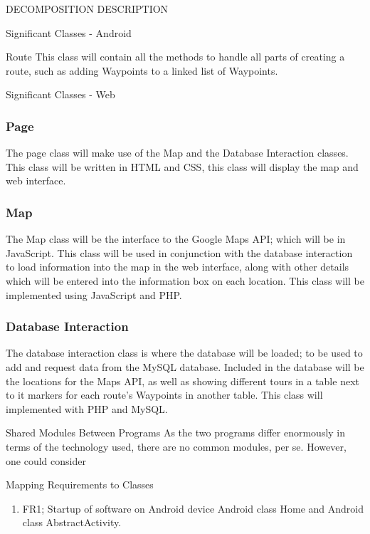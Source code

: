 \documentclass{article}
\begin{document}
\begin{section}{DECOMPOSITION DESCRIPTION}
\begin{subsection}{Significant Classes - Android}
		    \begin{subsubsection}{Route}
		    This class will contain all the methods to handle all parts of creating a route, such as adding Waypoints to a linked list of Waypoints.
		    \end{subsubsection}
	    \end{subsection}
	
	    \begin{subsection}{Significant Classes - Web}
		    \subsubsection{Page}
		    The page class will make use of the Map and the Database Interaction classes. This class will be written in HTML and CSS, this class will display the map and web interface.

		    \subsubsection{Map}
		    The Map class will be the interface to the Google Maps API; which will be in JavaScript. This class will be used in conjunction with the database interaction to load information into the map in the web interface, along with other details which will be entered into the information box on each location. This class will be implemented using JavaScript and PHP.

		    \subsubsection{Database Interaction}
		    The database interaction class is where the database will be loaded; to be used to add and request data from the MySQL database. Included in the database will be the locations for the Maps API, as well as showing different tours in a table next to it markers for each route's Waypoints in another table. This class will implemented with PHP and MySQL.
	    \end{subsection}

    
    \begin{subsection}{Shared Modules Between Programs}
        As the two programs differ enormously in terms of the technology used, there are no common modules, per se. However, one could consider
    \end{subsection}


	\clearpage
	\begin{subsection}{Mapping Requirements to Classes}
        \begin{enumerate}
		    \item{FR1; Startup of software on Android device}
		    Android class Home and Android class AbstractActivity.


\end{enumerate}
\end{subsection}
\end{section}
\end{document}

